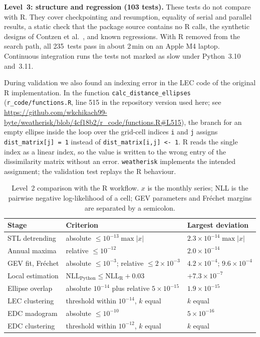 \documentclass[preprint,12pt,a4paper]{elsarticle}
\begin{document}
\textbf{Level~3: structure and regression (103 tests).}
These tests do not compare with R. They cover checkpointing and
resumption, equality of serial and parallel results, a static check
that the package source contains no R calls, the synthetic designs of
Contzen et al.~\cite{contzen2025}, and known regressions. With R
removed from the search path, all 235~tests pass in about 2\,min on
an Apple M4 laptop. Continuous integration runs the tests not marked
as slow under Python~3.10 and~3.11.

During validation we also found an indexing error in the LEC code of
the original R implementation. In the function
\texttt{calc\_distance\_ellipses} (\texttt{r\_code/functions.R},
line 515 in the repository version used here; see
\url{https://github.com/wkchikach99-byte/weatherisk/blob/4cf18b2/r_code/functions.R\#L515}),
the branch for an empty ellipse inside the loop over the grid-cell
indices \texttt{i} and \texttt{j} assigns \texttt{dist\_matrix[j] = 1}
instead of \texttt{dist\_matrix[i,j] <- 1}. R reads the single index as a linear index, so the value is written
to the wrong entry of the dissimilarity matrix without an error.
\texttt{weatherisk} implements the intended assignment; the
validation test replays the R behaviour.

\begin{table}[!htbp]
\centering
\small
\setlength{\tabcolsep}{4pt}
\begin{tabularx}{\textwidth}{>{\raggedright\arraybackslash}p{3.6cm}>{\raggedright\arraybackslash}X>{\raggedright\arraybackslash}p{3.0cm}}
\toprule
\textbf{Stage} & \textbf{Criterion} & \textbf{Largest deviation} \\
\midrule
STL detrending & absolute $\leq 10^{-13}\max|x|$ & \mbox{$2.3{\times}10^{-14}\max|x|$} \\
Annual maxima & relative $\leq 10^{-12}$ & $2.0\times10^{-14}$ \\
GEV fit, Fr\'{e}chet & absolute $\leq 10^{-3}$; relative $\leq 2\times10^{-3}$ & $4.2\times10^{-4}$; $9.6\times10^{-4}$ \\
Local estimation & $\mathrm{NLL}_{\text{Python}} \leq \mathrm{NLL}_{\text{R}} + 0.03$ & $+7.3\times10^{-7}$ \\
Ellipse overlap & absolute $10^{-14}$ plus relative $5\times10^{-15}$ & $1.9\times10^{-15}$ \\
LEC clustering & threshold within $10^{-14}$, $k$ equal & $k$ equal \\
EDC madogram & absolute $\leq 10^{-10}$ & $5\times10^{-16}$ \\
EDC clustering & threshold within $10^{-12}$, $k$ equal & $k$ equal \\
\bottomrule
\end{tabularx}
\caption{Level~2 comparison with the R workflow. $x$ is the monthly
  series; NLL is the pairwise negative log-likelihood of a cell; GEV
  parameters and Fr\'{e}chet margins are separated by a semicolon.}
\label{tab:pipeline-parity}
\end{table}
\end{document}
